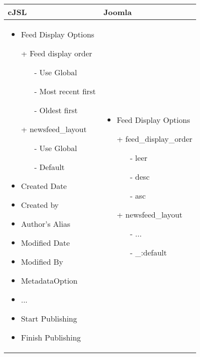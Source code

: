 \begin{minipage}{0.7\textwidth}
\begin{tabular}{|p{} | p{}|}
\hline
\textbf{cJSL} & \textbf{Joomla} \\ 
\hline
\begin{itemize}
\item Feed Display Options
     \item[+] Feed display order
            	\begin{enumerate}
            		\item[-] Use Global
            		\item[-] Most recent first
            		\item[-] Oldest first
            	\end{enumerate}	
      \item[+] newsfeed\_layout
      	\begin{enumerate}
           		\item[-] Use Global
           		\item[-] Default
           	\end{enumerate}
 \item  Created Date
 \item  Created by
 \item  Author's Alias
 \item  Modified Date
 \item  Modified By
 \item  MetadataOption
 \item  ...
 \item  Start Publishing
 \item  Finish Publishing
\end{itemize}
 & 
\begin{itemize}
\item Feed Display Options
		\item[+] feed\_display\_order
	   	\begin{enumerate}
	   		\item[-] leer
	   		\item[-] desc
	   		\item[-] asc
	   	\end{enumerate}
        \item[+] newsfeed\_layout
         	\begin{enumerate}
          		\item[-] ...
          		\item[-] \_:default
             \end{enumerate}

\end{itemize}
\end{tabular}
\end{minipage}
